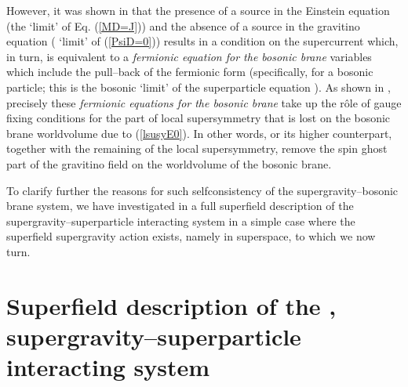 \documentclass[a4paper,11pt]{article}
\begin{document}
However, it was shown in \cite{BdAI1} that the presence of a source 
in the Einstein equation (the \coordHE{} 
`limit' of 
Eq. (\ref{MD=J})) and the absence of a source in the 
gravitino equation (\coordHE{} `limit' of 
(\ref{PsiD=0})) results in a condition on the supercurrent which, in  turn, 
is equivalent to a {\sl fermionic equation for the bosonic brane} variables 
which include the pull--back \coordHE{} of the fermionic form 
\coordHE{}  
(specifically, \coordHE{}
for a bosonic particle; this 
is the bosonic `limit' of the superparticle equation 
\coordHE{}). 
As shown in \cite{BdAI1}, precisely these {\sl fermionic equations 
for the bosonic brane} take up the r\^ole of gauge fixing conditions for 
the part of 
local supersymmetry that is lost on the bosonic brane worldvolume 
due to  (\ref{lsusyE0}). In other words, \coordHE{} or its higher \coordHE{}
counterpart, together with the remaining \coordHE{} of the 
local supersymmetry, remove the spin \coordHE{} ghost 
part of the gravitino field on the worldvolume of the bosonic brane. 


To clarify further the reasons  for such selfconsistency of the 
supergravity--bosonic brane system, we have investigated in \cite{BAIL4} 
a full superfield description of the supergravity--superparticle 
interacting system in a simple case where the superfield supergravity 
action exists, namely in \coordHE{}  \coordHE{} superspace, to which we now turn.  


\section{Superfield description of the \coordHE{}, \coordHE{} 
supergravity--superparticle interacting system}
\end{document}

